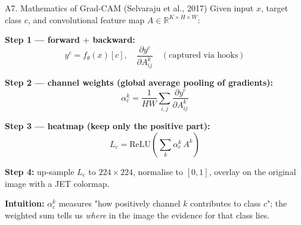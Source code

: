 \documentclass[10pt, aspectratio=169]{beamer}
\begin{document}
\begin{frame}{A7. Mathematics of Grad-CAM (Selvaraju et al., 2017)}
    \footnotesize
    Given input $x$, target class $c$, and convolutional feature map $A \in \mathbb{R}^{K \times H \times W}$:

    \textbf{Step 1 --- forward $+$ backward:}
    \[
        y^c = f_\theta(x)[c], \quad
        \frac{\partial y^c}{\partial A^k_{ij}} \quad (\text{captured via hooks})
    \]

    \textbf{Step 2 --- channel weights (global average pooling of gradients):}
    \[
        \alpha_c^k = \frac{1}{HW} \sum_{i,j} \frac{\partial y^c}{\partial A^k_{ij}}
    \]

    \textbf{Step 3 --- heatmap (keep only the positive part):}
    \[
        L_c = \mathrm{ReLU}\!\left( \sum_k \alpha_c^k \, A^k \right)
    \]

    \textbf{Step 4:} up-sample $L_c$ to $224\times 224$, normalise to $[0,1]$, overlay on the original image with a JET colormap.

    \vspace{0.2cm}
    \textbf{Intuition:} $\alpha_c^k$ measures "how positively channel $k$ contributes to class $c$"; the weighted sum tells us \textit{where} in the image the evidence for that class lies.
\end{frame}
\end{document}
